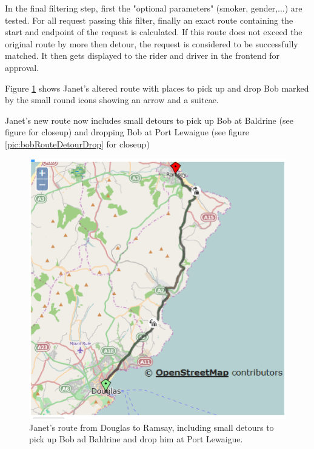 In the final filtering step, first the "optional parameters" (smoker, gender,...) 
are tested. For all request passing this filter, finally an exact route containing 
the start and endpoint of the request is calculated. 
If this route does not exceed the original route by more then detour, the request
is considered to be successfully matched.
It then gets displayed to the rider and driver in the frontend for approval.

Figure \ref{pic:bobRoute} shows Janet's altered route with places to pick up and
drop Bob marked by the small round icons showing an arrow and a suitcae. 

Janet's new route now includes small detours to pick up Bob at 
Baldrine (see figure \label{pic:bobRouteDetourPickup} for closeup)
and dropping Bob at Port Lewaigue (see figure \ref{pic:bobRouteDetourDrop} for closeup)

\begin{figure}[t]
\includegraphics[scale=0.5]{images/maps/02-OSM-with-Rider.eps}
\caption{Janet's route from Douglas to Ramsay, including small detours to pick up Bob
        ad Baldrine and drop him at Port Lewaigue.}
\label{pic:bobRoute}
\end{figure}


